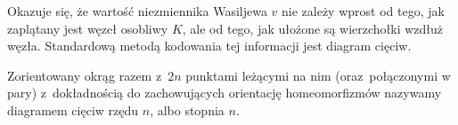 
Okazuje się, że wartość niezmiennika Wasiljewa $v$ nie zależy wprost od tego, jak zaplątany jest węzeł osobliwy $K$, ale od tego, jak ułożone są wierzchołki wzdłuż węzła. Standardową metodą kodowania tej informacji jest diagram cięciw.

\begin{definition}
%
    Zorientowany okrąg razem z~$2n$ punktami leżącymi na nim (oraz~połączonymi w pary) z~dokładnością do zachowujących orientację homeomorfizmów nazywamy diagramem cięciw rzędu $n$, albo stopnia $n$.
\end{definition}

